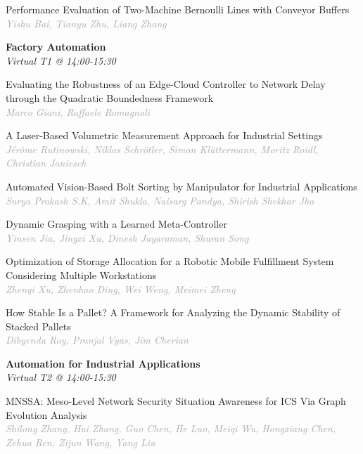 \begin{multicols*}{2}
\small Performance Evaluation of Two-Machine Bernoulli Lines with Conveyor Buffers\\ 
\footnotesize \textcolor{darkgray}{\textit{Yishu Bai, Tianyu  Zhu, Liang  Zhang}}

\normalsize \textbf{Factory Automation}\\
\small \textit{Virtual T1 @ 14:00-15:30}

\small Evaluating the Robustness of an Edge-Cloud Controller to Network Delay through the Quadratic Boundedness Framework\\ 
\footnotesize \textcolor{darkgray}{\textit{Marco Giani, Raffaele  Romagnoli}}

\small A Laser-Based Volumetric Measurement Approach for Industrial Settings\\ 
\footnotesize \textcolor{darkgray}{\textit{Jérôme Rutinowski, Niklas  Schrötler, Simon  Klüttermann, Moritz  Roidl, Christian  Janiesch}}

\small Automated Vision-Based Bolt Sorting by Manipulator for Industrial Applications\\ 
\footnotesize \textcolor{darkgray}{\textit{Surya Prakash S.K, Amit  Shukla, Naisarg  Pandya, Shirish Shekhar  Jha}}

\small Dynamic Grasping with a Learned Meta-Controller\\ 
\footnotesize \textcolor{darkgray}{\textit{Yinsen Jia, Jingxi  Xu, Dinesh  Jayaraman, Shuran  Song}}

\small Optimization of Storage Allocation for a Robotic Mobile Fulfillment System Considering Multiple Workstations\\ 
\footnotesize \textcolor{darkgray}{\textit{Zhenqi Xu, Zhenhao  Ding, Wei  Weng, Meimei  Zheng}}

\small How Stable Is a Pallet? A Framework for Analyzing the Dynamic Stability of Stacked Pallets\\ 
\footnotesize \textcolor{darkgray}{\textit{Dibyendu Roy, Pranjal  Vyas, Jim  Cherian}}

\normalsize \textbf{Automation for Industrial Applications}\\
\small \textit{Virtual T2 @ 14:00-15:30}

\small MNSSA: Meso-Level Network Security Situation Awareness for ICS Via Graph Evolution Analysis\\ 
\footnotesize \textcolor{darkgray}{\textit{Shilong Zhang, Hui  Zhang, Guo  Chen, He  Luo, Meiqi  Wu, Hongxiang  Chen, Zehua  Ren, Zijun  Wang, Yang  Liu}}


\end{multicols*}
